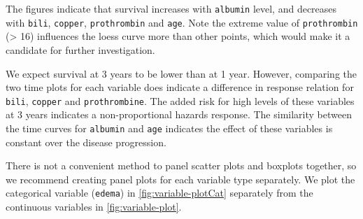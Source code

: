 \documentclass[article]{jss}
\begin{document}
The figures indicate that survival increases with \texttt{albumin}
level, and decreases with \texttt{bili}, \texttt{copper},
\texttt{prothrombin} and \texttt{age}. Note the extreme value of
\texttt{prothrombin} (\textgreater{} 16) influences the loess curve more
than other points, which would make it a candidate for further
investigation.

We expect survival at 3 years to be lower than at 1 year. However,
comparing the two time plots for each variable does indicate a
difference in response relation for \texttt{bili}, \texttt{copper} and
\texttt{prothrombine}. The added risk for high levels of these variables
at 3 years indicates a non-proportional hazards response. The similarity
between the time curves for \texttt{albumin} and \texttt{age} indicates
the effect of these variables is constant over the disease progression.

There is not a convenient method to panel scatter plots and boxplots
together, so we recommend creating panel plots for each variable type
separately. We plot the categorical variable (\texttt{edema}) in
\autoref{fig:variable-plotCat} separately from the continuous variables
in \autoref{fig:variable-plot}.
\end{document}
